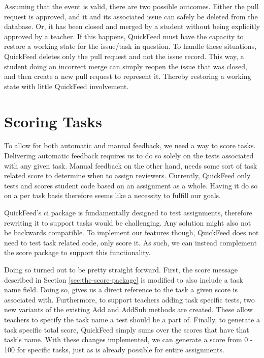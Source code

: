 Assuming that the event is valid, there are two possible outcomes.
Either the pull request is approved, and it and its associated issue can safely be deleted from the database.
Or, it has been closed and merged by a student without being explicitly approved by a teacher.
If this happens, QuickFeed must have the capacity to restore a working state for the issue/task in question.
To handle these situations, QuickFeed deletes only the pull request and not the issue record.
This way, a student doing an incorrect merge can simply reopen the issue that was closed, and then create a new pull request to represent it.
Thereby restoring a working state with little QuickFeed involvement.

\section{Scoring Tasks}

To allow for both automatic and manual feedback, we need a way to score tasks.
Delivering automatic feedback requires us to do so solely on the tests associated with any given task.
Manual feedback on the other hand, needs some sort of task related score to determine when to assign reviewers.
Currently, QuickFeed only tests and scores student code based on an assignment as a whole.
Having it do so on a per task basis therefore seems like a necessity to fulfill our goals.

QuickFeed's ci package is fundamentally designed to test assignments, therefore rewriting it to support tasks would be challenging.
Any solution might also not be backwards compatible.
To implement our features though, QuickFeed does not need to test task related code, only score it.
As such, we can instead complement the score package to support this functionality.

Doing so turned out to be pretty straight forward.
First, the score message described in Section \ref{sec:the-score-package} is modified to also include a task name field.
Doing so, gives us a direct reference to the task a given score is associated with.
Furthermore, to support teachers adding task specific tests, two new variants of the existing Add and AddSub methods are created.
These allow teachers to specify the task name a test should be a part of.
Finally, to generate a task specific total score, QuickFeed simply sums over the scores that have that task's name.
With these changes implemented, we can generate a score from 0 - 100 for specific tasks, just as is already possible for entire assignments.

